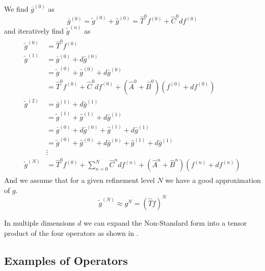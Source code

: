 \documentclass[../master_thesis.tex]{subfiles}
\begin{document}
We find $\bar{g}^{(0)}$ as
\begin{equation}
  \bar{g}^{(0)} =  \tilde{g}^{(0)} + \hat{g}^{(0)} = \hat{T}^{0}f^{(0)} + \hat{C}^{0}df^{(0)}
\end{equation}
and iteratively find $\tilde{g}^{(n)}$ as \cite{Frediani:2013}
\begin{align}
  \begin{split}
    \tilde{g}^{(0)} &= \hat{T}^{0}f^{(0)} \\
    \tilde{g}^{(1)} &= \bar{g}^{(0)} + d\bar{g}^{(0)} \\
    &= \tilde{g}^{(0)} + \hat{g}^{(0)} + d\bar{g}^{(0)}\\
    &= \hat{T}^{0}f^{(0)} + \hat{C}^{0}df^{(0)} + \left(\hat{A}^{0} + \hat{B}^{0}\right)\left(f^{(0)} + df^{(0)}\right)\\
    \tilde{g}^{(2)} &= \bar{g}^{(1)} + d\bar{g}^{(1)}\\
    &= \tilde{g}^{(1)} + \hat{g}^{(1)} + d\bar{g}^{(1)} \\
    &= \bar{g}^{(0)} + d\bar{g}^{(0)} + \hat{g}^{(1)} + d\bar{g}^{(1)}\\
    &= \tilde{g}^{(0)} + \hat{g}^{(0)} + d\bar{g}^{(0)} + \hat{g}^{(1)} + d\bar{g}^{(1)}\\
    &\vdots\\
    \tilde{g}^{(N)} &= \hat{T}^{0}f^{(0)} + \sum^N_{n=0}\hat{C}^{n}df^{(n)} + \left(\hat{A}^{n} + \hat{B}^{n}\right)\left(f^{(n)}
    + df^{(n)}\right)
  \end{split}
\end{align}
And we assume that for a given refinement level $N$ we have a good approximation of
$g$.
\begin{equation}
  \tilde{g}^{(N)} \approx g^{N} = (\hat{T}f)^N
\end{equation}

In multiple dimensions $d$ we can expand the Non-Standard form into a tensor product of
the four operators as shown in \cite{Frediani:2013}.
\subsection{Examples of Operators}
\end{document}
